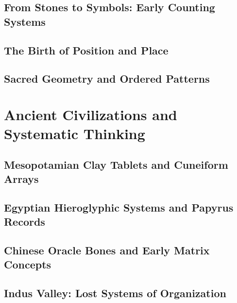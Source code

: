 \documentclass[12pt, oneside, openany]{book}
\begin{document}
\section{From Stones to Symbols: Early Counting Systems}

\section{The Birth of Position and Place}

\section{Sacred Geometry and Ordered Patterns}


\chapter{Ancient Civilizations and Systematic Thinking}

\section{Mesopotamian Clay Tablets and Cuneiform Arrays}

\section{Egyptian Hieroglyphic Systems and Papyrus Records}

\section{Chinese Oracle Bones and Early Matrix Concepts}

\section{Indus Valley: Lost Systems of Organization}
\end{document}
